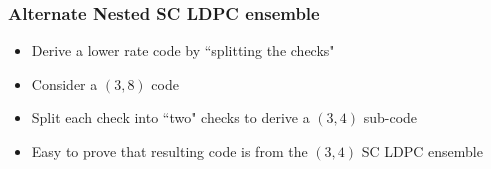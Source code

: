 \documentclass[10pt]{beamer}
\begin{document}
\begin{frame}\frametitle{Alternate Nested SC LDPC ensemble}
\begin{itemize}
		\item<1-> Derive a lower rate code by ``splitting the checks"
					\vspace{2pt}
		\item<1-> Consider a $(3,8)$ code
					\vspace{2pt}
		\item<2-> Split each check into ``two" checks to derive a $(3,4)$ sub-code
					\vspace{2pt}
		\item<2-> Easy to prove that resulting code is from the $(3,4)$ SC LDPC ensemble
\end{itemize}
\vspace{0.3in}
    \begin{figure}
        \begin{center}

\end{center}
\end{figure}
\end{frame}
\end{document}

